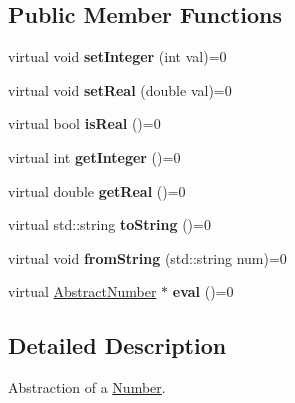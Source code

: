 \subsection*{Public Member Functions}
\begin{DoxyCompactItemize}
\item 
\hypertarget{class_abstract_number_ad228c204b2f3f5bb38d485f0f2181a36}{virtual void {\bfseries set\-Integer} (int val)=0}\label{class_abstract_number_ad228c204b2f3f5bb38d485f0f2181a36}

\item 
\hypertarget{class_abstract_number_a3504505a90056cf3c3386504485efd7a}{virtual void {\bfseries set\-Real} (double val)=0}\label{class_abstract_number_a3504505a90056cf3c3386504485efd7a}

\item 
\hypertarget{class_abstract_number_ac1678d857454b514de3a8ead2578c077}{virtual bool {\bfseries is\-Real} ()=0}\label{class_abstract_number_ac1678d857454b514de3a8ead2578c077}

\item 
\hypertarget{class_abstract_number_a5b68f6e27a691708677d6b8456d79643}{virtual int {\bfseries get\-Integer} ()=0}\label{class_abstract_number_a5b68f6e27a691708677d6b8456d79643}

\item 
\hypertarget{class_abstract_number_aeb63781d71667a7b931637388a91a45f}{virtual double {\bfseries get\-Real} ()=0}\label{class_abstract_number_aeb63781d71667a7b931637388a91a45f}

\item 
\hypertarget{class_abstract_number_a079134fa338f79cbecf7c0c0b0b53327}{virtual std\-::string {\bfseries to\-String} ()=0}\label{class_abstract_number_a079134fa338f79cbecf7c0c0b0b53327}

\item 
\hypertarget{class_abstract_number_a9a3a051700f770168f933cfb5b3220f0}{virtual void {\bfseries from\-String} (std\-::string num)=0}\label{class_abstract_number_a9a3a051700f770168f933cfb5b3220f0}

\item 
\hypertarget{class_abstract_number_ab3fbd477d27fb53fe81e5afabd6639fa}{virtual \hyperlink{class_abstract_number}{Abstract\-Number} $\ast$ {\bfseries eval} ()=0}\label{class_abstract_number_ab3fbd477d27fb53fe81e5afabd6639fa}

\end{DoxyCompactItemize}


\subsection{Detailed Description}
Abstraction of a \hyperlink{class_number}{Number}. 

